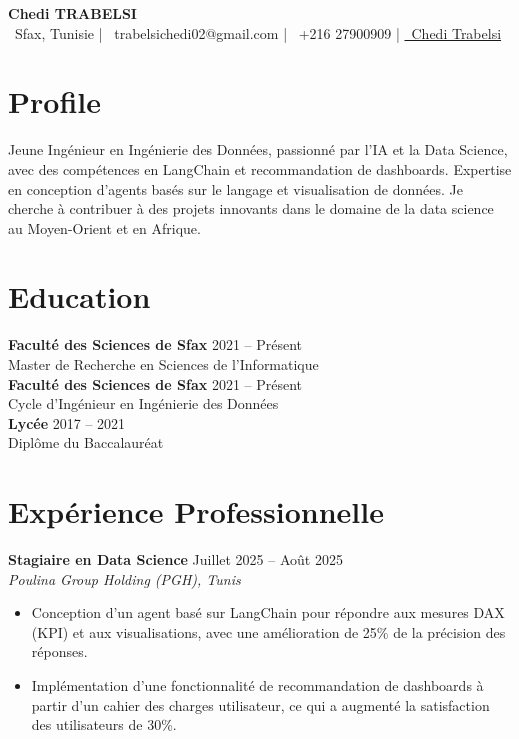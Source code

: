 \documentclass[9pt]{article}
\begin{document}
\begin{center}
    {\Large \textbf{Chedi TRABELSI}}\\[0.3em]
    \faMapMarker\ Sfax, Tunisie | \quad
    \faEnvelope~trabelsichedi02@gmail.com \quad | \quad 
    \faPhone*~+216 27900909 \quad |
    \href{https://www.linkedin.com/in/cheditrabelsi}{\raisebox{-0.05\height} \faLinkedin\ Chedi Trabelsi}
\end{center}
\vspace{0.2em}

\section*{Profile}
Jeune Ingénieur en Ingénierie des Données, passionné par l'IA et la Data Science, avec des compétences en LangChain et recommandation de dashboards. Expertise en conception d'agents basés sur le langage et visualisation de données. Je cherche à contribuer à des projets innovants dans le domaine de la data science au Moyen-Orient et en Afrique.

\section*{Education}
\textbf{Faculté des Sciences de Sfax} \hfill 2021 -- Présent \\
Master de Recherche en Sciences de l'Informatique \\
\textbf{Faculté des Sciences de Sfax} \hfill 2021 -- Présent \\
Cycle d'Ingénieur en Ingénierie des Données \\
\textbf{Lycée} \hfill 2017 -- 2021 \\
Diplôme du Baccalauréat

\section*{Expérience Professionnelle}
\textbf{Stagiaire en Data Science} \hfill Juillet 2025 -- Août 2025 \\
\textit{\small Poulina Group Holding (PGH), Tunis} \vspace{-2mm}
\begin{itemize}[itemsep=-0.2em] 
    \item Conception d'un agent basé sur LangChain pour répondre aux mesures DAX (KPI) et aux visualisations, avec une amélioration de 25\% de la précision des réponses.
    \item Implémentation d'une fonctionnalité de recommandation de dashboards à partir d'un cahier des charges utilisateur, ce qui a augmenté la satisfaction des utilisateurs de 30\%.
\end{itemize}
\vspace{1mm}
\end{document}
